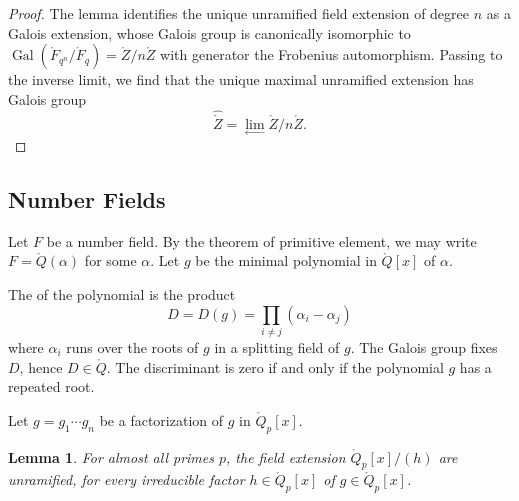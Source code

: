 \documentclass{amsart}
\newtheorem{lemma}[equation]{Lemma}
\def\op#1{{\operatorname{#1}}}
\def\oG{\op{Gal}}
\begin{document}
\begin{proof} The lemma identifies the unique unramified field
  extension of degree $n$ as a Galois extension, whose Galois group is
  canonically isomorphic to $\oG(\ring{F}_{q^n}/\ring{F}_q) =
  \ring{Z}/n\ring{Z}$ with generator the Frobenius automorphism.
  Passing to the inverse limit, we find that the unique maximal
  unramified extension has Galois group
\[
\hat{\ring{Z}} = \lim_{\leftarrow} \ring{Z}/n\ring{Z}.
\]
\end{proof}


\subsection{Number Fields}

Let $F$ be a number field. By the theorem of
primitive element, we may write $F = \ring{Q}(\alpha)$ for some
$\alpha$.  Let $g$ be the minimal polynomial in $\ring{Q}[x]$ of
$\alpha$.

The  of the polynomial is the product
\[
D = D(g) = \prod_{i\ne j} (\alpha_i-\alpha_j)
\]
where $\alpha_i$ runs over the roots of $g$ in a splitting field of
$g$.  The Galois group fixes $D$, hence $D\in\ring{Q}$.  The
discriminant is zero if and only if the polynomial $g$ has a repeated
root.

Let $g=g_1\cdots g_n$ be a factorization of $g$ in $\ring{Q}_p[x]$.

\begin{lemma} 
  For almost all primes $p$, the field extension $\ring{Q}_p[x]/(h)$
  are unramified, for every irreducible factor $h\in\ring{Q}_p[x]$ of
  $g\in\ring{Q}_p[x]$.
\end{lemma}
\end{document}
